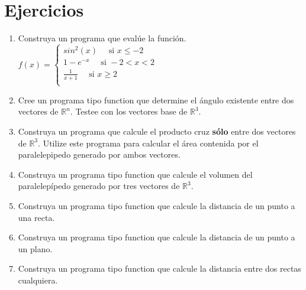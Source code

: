 \documentclass[11pt]{article}
\begin{document}
  \section{Ejercicios}
  \begin{enumerate}
  
  \item Construya un programa que eval\'ue la funci\'on. 
  $f(x)=\begin{cases}																					sin^2(x)\quad \text{ si } x\leq -2\\														1-e^{-x}\quad \text{ si } -2 < x< 2\\														\frac{1}{x+1} \quad \text{ si }  x\geq 2\\												\end{cases}$
  
\item Cree un programa tipo function que determine el \'angulo existente entre dos vectores de $\mathbb{R}^{n}$. Testee con los vectores base de $\mathbb{R}^3$.
								
\item Construya un programa que calcule el producto cruz \textbf{s\'olo} entre dos vectores de $\mathbb{R}^3$. Utilize este programa para calcular el \'area contenida por el paralelepipedo generado por ambos vectores.

\item Construya un programa tipo function que calcule el volumen del paralelep\'ipedo generado por tres vectores de $\mathbb{R}^3$.

\item Construya un programa tipo function que calcule la distancia de un punto a una recta.

\item Construya un programa tipo function que calcule la distancia de un punto a un plano.

\item Construya un programa tipo function que calcule la distancia entre dos rectas cualquiera.


\end{enumerate}
\end{document}
